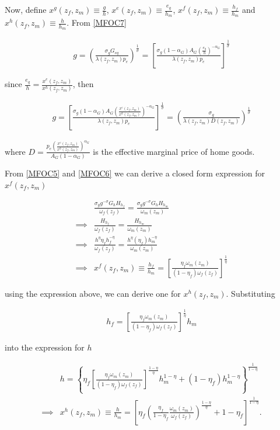 \documentclass[12pt]{article}
\begin{document}
Now, define $x^g(z_f,z_m)\equiv\frac{g}{h}$, $x^e(z_f,z_m)\equiv\frac{e_q}{h_m}$, $x^f(z_f,z_m)\equiv\frac{h_f}{h_m}$ and $x^h(z_f,z_m)\equiv\frac{h}{h_m}$. From \ref{MFOC7}

\begin{align*}
	g = \left(\frac{\sigma_g G_{eq}}{\lambda(z_f,z_m) p_e}\right)^{\frac{1}{\sigma}}=\left[\frac{\sigma_g \left(1-\alpha_G\right)A_G\left(\frac{e_q}{h}\right)^{-\alpha_G}}{\lambda(z_f,z_m) p_e}\right]^{\frac{1}{\sigma}}
\end{align*}

since $\frac{e_q}{h}=\frac{x^e(z_f,z_m)}{x^h(z_f,z_m)}$, then

\begin{align*}
	g = \left[\frac{\sigma_g \left(1-\alpha_G\right)A_G\left(\frac{x^e(z_f,z_m)}{x^h(z_f,z_m)}\right)^{-\alpha_G}}{\lambda(z_f,z_m) p_e}\right]^{\frac{1}{\sigma}}=\left(\frac{\sigma_g}{\lambda(z_f,z_m) D(z_f,z_m)}\right)^{\frac{1}{\sigma}}
\end{align*}

where $D = \frac{p_e\left(\frac{x^e(z_f,z_m)}{x^h(z_f,z_m)}\right)^{\alpha_G}}{A_G\left(1-\alpha_G\right)}$ is the effective marginal price of home goods.

From \ref{MFOC5} and \ref{MFOC6} we can derive a closed form expression for $x^f(z_f,z_m)$

\begin{align*}
	& \frac{\sigma_g g^{-\sigma}G_hH_{h_f}}{\omega_f(z_f)}=\frac{\sigma_g g^{-\sigma}G_hH_{h_m}}{\omega_m(z_m)} \\ \implies & \frac{H_{h_f}}{\omega_f(z_f)}=\frac{H_{h_m}}{\omega_m(z_m)} \\
    \implies & \frac{h^{\eta}\eta_f h_f^{-\eta}}{\omega_f(z_f)}=\frac{h^{\eta}\left(\eta_f\right)h_m^{-\eta}}{\omega_m(z_m)} \\
    \implies & x^f(z_f,z_m) \equiv \frac{h_f}{h_m} = \left[\frac{\eta_f \omega_m(z_m)}{\left(1-\eta_f\right)\omega_f(z_f)}\right]^{\frac{1}{\eta}} 
\end{align*}

using the expression above, we can derive one for $x^h(z_f,z_m)$. Substituting 

\begin{align*}
	h_f = \left[\frac{\eta_f \omega_m(z_m)}{\left(1-\eta_f\right)\omega_f(z_f)}\right]^{\frac{1}{\eta}}h_m
\end{align*}

into the expression for $h$

\begin{align*}
	& h = \left\lbrace \eta_f \left[\frac{\eta_f \omega_m(z_m)}{\left(1-\eta_f\right)\omega_f(z_f)}\right]^{\frac{1-\eta}{\eta}}h_m^{1-\eta}+\left(1-\eta_f\right)h_m^{1-\eta} \right\rbrace^{\frac{1}{1-\eta}} \\
	\implies & x^h(z_f,z_m) \equiv \frac{h}{h_m} = \left[\eta_f\left(\frac{\eta_f}{1-\eta_f} \frac{\omega_m(z_m)}{\omega_f(z_f)}\right)^{\frac{1-\eta}{\eta}}+1-\eta_f\right]^\frac{1}{1-\eta}.
\end{align*}
\end{document}
